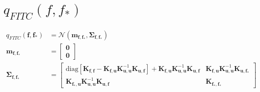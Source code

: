 \documentclass[12pt, landscape]{article}
\begin{document}
\section{$q_{FITC}(f,f_{*})$}
\begingroup\makeatletter{}\check@mathfonts
\def\maketag@@@#1{\hbox{\m@th\large\normalfont#1}}
\begin{align*}
q_{FITC}\left(\mathbf{f},\mathbf{f_{*}}\right)&= \mathcal{N}\left(\mathbf{m}_{\mathbf{f},\mathbf{f_{*}}},\mathbf{\Sigma}_{\mathbf{f},\mathbf{f_{*}}}\right)\\
\mathbf{m}_{\mathbf{f},\mathbf{f_{*}}} &= \left[\begin{smallmatrix}\mathbf{0}\\\mathbf{0}\end{smallmatrix}\right]\\
\mathbf{\Sigma}_{\mathbf{f},\mathbf{f_{*}}} &= \left[\begin{smallmatrix}\text{diag}[\mathbf{K}_{\mathbf{f},\mathbf{f}} - \mathbf{K}_{\mathbf{f},\mathbf{u}} \mathbf{K}_{\mathbf{u},\mathbf{u}}^{-1} \mathbf{K}_{\mathbf{u},\mathbf{f}}] + \mathbf{K}_{\mathbf{f},\mathbf{u}} \mathbf{K}_{\mathbf{u},\mathbf{u}}^{-1} \mathbf{K}_{\mathbf{u},\mathbf{f}}&\mathbf{K}_{\mathbf{f},\mathbf{u}} \mathbf{K}_{\mathbf{u},\mathbf{u}}^{-1} \mathbf{K}_{\mathbf{u},\mathbf{f_{*}}}\\\mathbf{K}_{\mathbf{f_{*}},\mathbf{u}} \mathbf{K}_{\mathbf{u},\mathbf{u}}^{-1} \mathbf{K}_{\mathbf{u},\mathbf{f}}&\mathbf{K}_{\mathbf{f_{*}},\mathbf{f_{*}}}\end{smallmatrix}\right]\\
\end{align*}\endgroup
\end{document}

